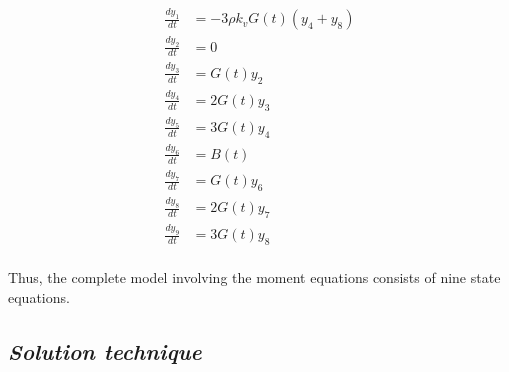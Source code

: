 \documentclass[3p,times,authoryear]{elsarticle}
\begin{document}
\begin{align} 
\frac{dy_{1}}{dt} &= -3\rho k_{v}G(t)(y_{4}+y_{8}) \label{eq1}\\
\frac{dy_{2}}{dt} &= 0 \label{eq2}\\
\frac{dy_{3}}{dt} &= G(t)y_{2} \label{eq3} \\
\frac{dy_{4}}{dt} &= 2G(t)y_{3} \label{eq4}\\
\frac{dy_{5}}{dt} &= 3G(t)y_{4} \label{eq5}\\
\frac{dy_{6}}{dt} &= B(t)  \label{eq6}\\
\frac{dy_{7}}{dt} &= G(t)y_{6}  \label{eq7}\\
\frac{dy_{8}}{dt} &= 2G(t)y_{7} \label{eq8} \\
\frac{dy_{9}}{dt} &= 3G(t)y_{8} \label{eq9} \\
\end{align} 


Thus, the complete model involving the moment equations consists of nine state equations.
\subsection{\textit{Solution technique}} \label{soltech} 
\end{document}
